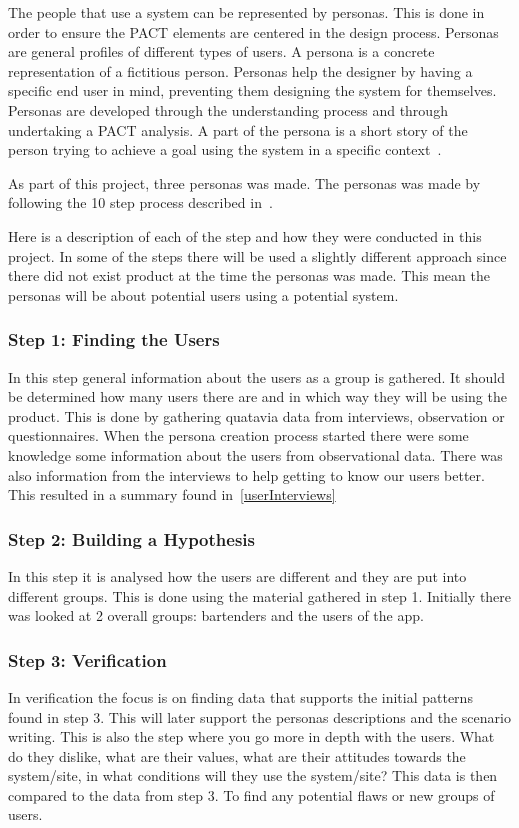 The people that use a system can be represented by personas. This is done in order to ensure the PACT elements are centered in the design process. Personas are general profiles of different types of users. A persona is a concrete representation of a fictitious person. Personas help the designer by having a specific end user in mind, preventing them designing the system for themselves. Personas are developed through the understanding process and through undertaking a PACT analysis. A part of the persona is a short story of the person trying to achieve a goal using the system in a specific context~\cite{benyon2013designing}.

As part of this project, three personas was made. The personas was made by following the 10 step process described in~\cite{lene2007persona}.

Here is a description of each of the step and how they were conducted in this project. In some of the steps there will be used a slightly different approach since there did not exist product at the time the personas was made. This mean the personas will be about potential users using a potential system.

\subsubsection{Step 1: Finding the Users}
In this step general information about the users as a group is gathered. It should be determined how many users there are and in which way they will be using the product. This is done by gathering quatavia data from interviews, observation or questionnaires. When the persona creation process started there were some knowledge some information about the users from observational data. There was also information from the interviews to help getting to know our users better. This resulted in a summary found in~\cref{userInterviews}

\subsubsection{Step 2: Building a Hypothesis}
In this step it is analysed how the users are different and they are put into different groups. This is done using the material gathered in step 1. Initially there was looked at 2 overall groups: bartenders and the users of the app.

\subsubsection{Step 3: Verification}
In verification the focus is on finding data that supports the initial patterns found in step 3. This will later support the personas descriptions and the scenario writing. This is also the step where you go more in depth with the users. What do they dislike, what are their values, what are their attitudes towards the system/site, in what conditions will they use the system/site? This data is then compared to the data from step 3. To find any potential flaws or new groups of users.

